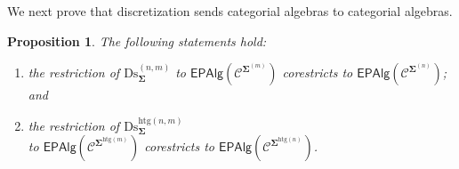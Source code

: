 \documentclass[a4paper, reqno]{amsbook}
\newcommand{\sig}[1]{\mathbf{#1}}             %
\newcommand{\spec}[1]{\boldsymbol{\mathcal{#1}}} %
\newcommand{\htg}{\mathrm{htg}}                %
\newcommand{\Ds}{\mathrm{Ds}}
\theoremstyle{plain}
\newtheorem{proposition}[theorem]{Proposition}
\theoremstyle{definition}
\begin{document}
We next prove that discretization sends categorial algebras to categorial algebras.

\begin{proposition}\label{PDsEpVariety}
The following statements hold:
\begin{enumerate}
\item the restriction of $\Ds^{(n,m)}_{\sig{\Sigma}}$ to $\mathsf{EPAlg}(\spec{C}^{\sig{\Sigma}^{(m)}})$ corestricts to $\mathsf{EPAlg}(\spec{C}^{\sig{\Sigma}^{(n)}})$; and
\item the restriction of $\Ds^{\htg(n,m)}_{\sig{\Sigma}}$\\ to $\mathsf{EPAlg}(\spec{C}^{\sig{\Sigma}^{\htg(m)}})$ corestricts to $\mathsf{EPAlg}(\spec{C}^{\sig{\Sigma}^{\htg(n)}})$.
\end{enumerate}
\end{proposition}
\end{document}
